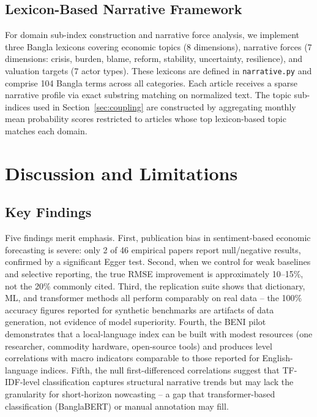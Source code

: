 \documentclass[11pt]{article}
\begin{document}
\subsection{Lexicon-Based Narrative Framework}\label{sec:topic-lexicon}

For domain sub-index construction and narrative force analysis, we implement three Bangla lexicons covering economic topics (8 dimensions), narrative forces (7 dimensions: crisis, burden, blame, reform, stability, uncertainty, resilience), and valuation targets (7 actor types). These lexicons are defined in \texttt{narrative.py} and comprise 104 Bangla terms across all categories. Each article receives a sparse narrative profile via exact substring matching on normalized text. The topic sub-indices used in Section~\ref{sec:coupling} are constructed by aggregating monthly mean probability scores restricted to articles whose top lexicon-based topic matches each domain.

\section{Discussion and Limitations}

\subsection{Key Findings}

Five findings merit emphasis. First, publication bias in sentiment-based economic forecasting is severe: only 2 of 46 empirical papers report null/negative results, confirmed by a significant Egger test. Second, when we control for weak baselines and selective reporting, the true RMSE improvement is approximately 10--15\%, not the 20\% commonly cited. Third, the replication suite shows that dictionary, ML, and transformer methods all perform comparably on real data -- the 100\% accuracy figures reported for synthetic benchmarks are artifacts of data generation, not evidence of model superiority. Fourth, the BENI pilot demonstrates that a local-language index can be built with modest resources (one researcher, commodity hardware, open-source tools) and produces level correlations with macro indicators comparable to those reported for English-language indices. Fifth, the null first-differenced correlations suggest that TF-IDF-level classification captures structural narrative trends but may lack the granularity for short-horizon nowcasting -- a gap that transformer-based classification (BanglaBERT) or manual annotation may fill.
\end{document}
